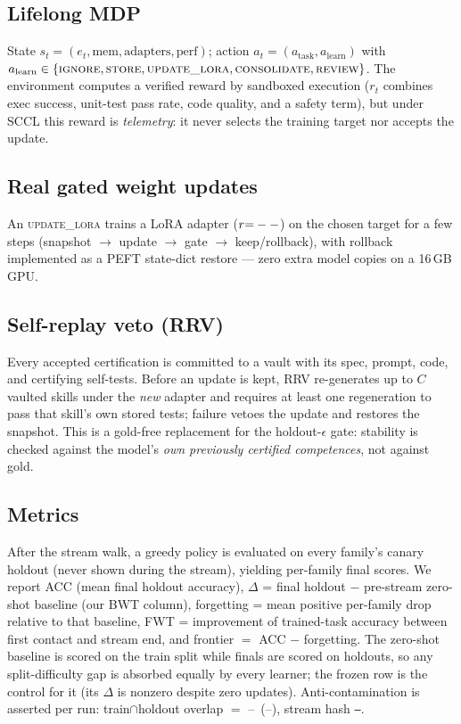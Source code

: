 \documentclass[10pt,conference]{IEEEtran}
\newcommand{\canaryOverlap}{--}\newcommand{\canaryClean}{--}\newcommand{\streamHash}{--}%
\begin{document}
\subsection{Lifelong MDP}
State $s_t=(e_t, \text{mem}, \text{adapters}, \text{perf})$; action $a_t=(a_{\text{task}}, a_{\text{learn}})$ with $a_{\text{learn}} \in \{\textsc{ignore}, \textsc{store}, \textsc{update\_lora}, \textsc{consolidate}, \textsc{review}\}$. The environment computes a verified reward by sandboxed execution ($r_t$ combines exec success, unit-test pass rate, code quality, and a safety term), but under SCCL this reward is \emph{telemetry}: it never selects the training target nor accepts the update.

\subsection{Real gated weight updates}
An \textsc{update\_lora} trains a LoRA adapter \cite{hu2021lora} ($r{=}--$) on the chosen target for a few steps (snapshot $\to$ update $\to$ gate $\to$ keep/rollback), with rollback implemented as a PEFT state-dict restore --- zero extra model copies on a 16\,GB GPU.

\subsection{Self-replay veto (RRV)}
Every accepted certification is committed to a vault with its spec, prompt, code, and certifying self-tests. Before an update is kept, RRV re-generates up to $C$ vaulted skills under the \emph{new} adapter and requires at least one regeneration to pass that skill's own stored tests; failure vetoes the update and restores the snapshot. This is a gold-free replacement for the holdout-$\epsilon$ gate: stability is checked against the model's \emph{own previously certified competences}, not against gold.

\subsection{Metrics}
After the stream walk, a greedy policy is evaluated on every family's canary holdout (never shown during the stream), yielding per-family final scores. We report ACC (mean final holdout accuracy), $\Delta$ = final holdout $-$ pre-stream zero-shot baseline (our BWT column), forgetting = mean positive per-family drop relative to that baseline, FWT = improvement of trained-task accuracy between first contact and stream end, and frontier $=$ ACC $-$ forgetting. The zero-shot baseline is scored on the train split while finals are scored on holdouts, so any split-difficulty gap is absorbed equally by every learner; the frozen row is the control for it (its $\Delta$ is nonzero despite zero updates). Anti-contamination is asserted per run: train$\cap$holdout overlap $=$ \canaryOverlap\ (\canaryClean), stream hash \texttt{\streamHash}.
\end{document}
